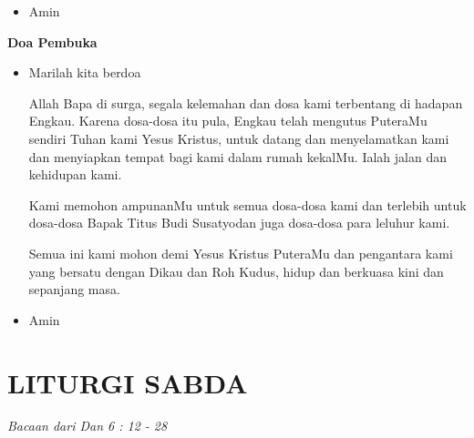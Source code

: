 \documentclass[a5paper,headsepline,titlepage,12pt,nnormalheadings,DIVcalc,twoside]{scrbook}
\makeatletter
\newcommand{\subjudul}[1]{%
  {\parindent \z@ 
    \interlinepenalty\@M \bfseries #1\par\nobreak \vskip 10\p@ }}
\newcommand{\keterangan}[1]{%
  {\parindent \z@  \slshape 
    \interlinepenalty\@M \textsl{#1}\par\nobreak  \vskip 5\p@}}
\newcommand{\BU}[1]{\begin{itemize} \item[U:] #1 \end{itemize}}
\newcommand{\BI}[1]{\begin{itemize} \item[I:] #1 \end{itemize}}
\newcommand{\namaalm}{Bapak Titus Budi Susatyo}
\makeatother
\begin{document}
\BU{Amin}

 

\subjudul{Doa Pembuka}

\BI{Marilah kita berdoa 

Allah Bapa di surga, segala kelemahan dan dosa kami 
terbentang di hadapan Engkau. Karena dosa-dosa itu 
pula, Engkau telah mengutus PuteraMu sendiri Tuhan 
kami Yesus Kristus, untuk datang dan menyelamatkan 
kami dan menyiapkan tempat bagi kami dalam rumah 
kekalMu. Ialah jalan dan kehidupan kami. 

Kami memohon ampunanMu untuk semua dosa-dosa kami 
dan terlebih untuk dosa-dosa \namaalm dan juga dosa-dosa para leluhur kami. 

Semua ini kami mohon demi Yesus Kristus PuteraMu dan 
pengantara kami yang bersatu dengan Dikau dan Roh 
Kudus, hidup dan berkuasa kini dan sepanjang masa.}

\BU{Amin}

 

\section*{LITURGI SABDA} 

\keterangan{Bacaan dari Dan 6 : 12 - 28}
\end{document}
